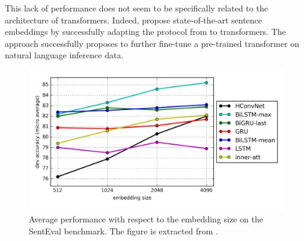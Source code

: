 This lack of performance does not seem to be specifically related to the architecture of transformers. Indeed, \textcite{reimers_19} propose state-of-the-art sentence embeddings by successfully adapting the protocol from \textcite{conneau_17} to transformers. The approach successfully proposes to further fine-tune a pre-trained transformer on natural language inference data.

\begin{figure}[htb!]
	\includegraphics[width=\textwidth]{images/snli_em_size.png}
	\caption{Average performance with respect to the embedding size on the SentEval benchmark. The figure is extracted from \textcite{conneau_17}.}
\end{figure}




